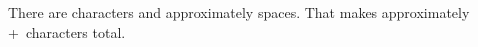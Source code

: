 
There are \thechar characters and approximately \theword spaces.
That makes approximately \the\numexpr\theword+\thechar\relax\ characters total.




